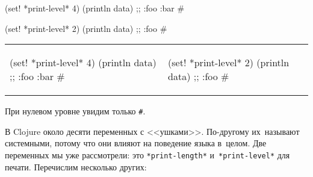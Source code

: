\ifnarrow

\begin{english}
  \begin{clojure}
(set! *print-level* 4)
(println data)
;; {:foo {:bar #}}
  \end{clojure}

\splitter

  \begin{clojure}
(set! *print-level* 2)
(println data)
;; {:foo #}
  \end{clojure}
\end{english}

\else

\begin{english}
\noindent
\begin{tabular}{ @{}p{5cm} @{}p{5cm} }


  \begin{clojure}
(set! *print-level* 4)
(println data)
;; {:foo {:bar #}}
  \end{clojure}

&

  \begin{clojure}
(set! *print-level* 2)
(println data)
;; {:foo #}
  \end{clojure}

\end{tabular}

\end{english}

\fi

\noindent
При нулевом уровне увидим только \verb|#|.

В Clojure около десяти переменных с <<ушками>>. По-другому их~называют
системными, потому что они влияют на поведение языка в~целом. Две переменных мы
уже рассмотрели: это \verb|*print-length*| и~\verb|*print-level*| для
печати. Перечислим несколько других:



